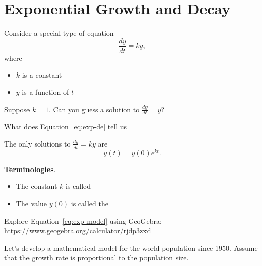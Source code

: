 \documentclass[../main.tex]{subfiles}
\begin{document}
%
%
%
%
\clearpage

\section{Exponential Growth and Decay}
Consider a special type of equation
\begin{equation} \label{eq:exp-de}
  \frac{dy}{dt} = ky,
\end{equation}
where 
\begin{itemize}
  \item \(k\) is {a constant}
    \bigskip

  \item \(y\) is {a function of \(t\)}
\end{itemize}
\vspace{1in}

Suppose \(k = 1\). Can you guess a solution to \(\frac{dy}{dt} = y\)?
\vspace{1in}

What does Equation~\eqref{eq:exp-de} tell us 
\vfill

\clearpage

\begin{mdframed}[style=withref]
  The only solutions to \(\frac{dy}{dt} = ky\) are 
  \begin{equation} \label{eq:exp-model}
    {y(t) = y(0) e^{kt}.}
  \end{equation}

\end{mdframed}

\textbf{Terminologies}. 
\begin{itemize}

\item The constant \(k\) is called
  \bigskip

\item The value \(y(0)\) is called the 
  \bigskip
\end{itemize}

Explore Equation~\eqref{eq:exp-model} using GeoGebra: \url{https://www.geogebra.org/calculator/rjdp3zxd}

\bigskip

\begin{example}
  Let's develop a mathematical model for the world population since 1950. 
  Assume that the growth rate is proportional to the population size.
\end{example}
\clearpage
\end{document}
